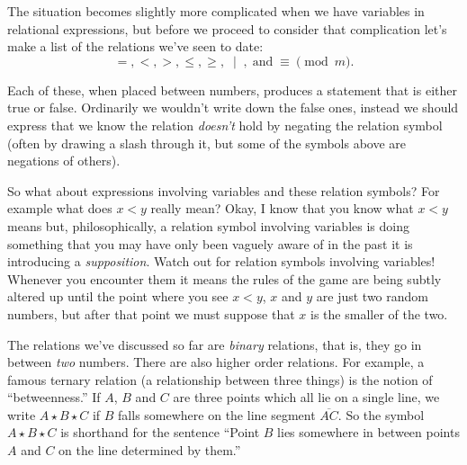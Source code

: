 \documentclass[10pt,]{book}
\theoremstyle{plain}
\theoremstyle{definition}
\theoremstyle{definition}
\numberwithin{equation}{section}
\newcommand{\divides}{\!\mid\!}
\newcommand{\lt}{ < }
\begin{document}
    The situation becomes slightly more complicated when we have
    variables in relational expressions, but before we proceed to
    consider that complication let's make a list of the relations
    we've seen to date:
    \begin{equation*}
      =, \lt , >, \leq, \geq,\; \divides \; , \; \mbox{and}  \; \equiv \pmod{m}.
    \end{equation*}
\par

    Each of these, when placed between numbers, produces a statement that
    is either true or false. Ordinarily we wouldn't write down the
    false ones, instead we should express that we know the relation
    \emph{doesn't} hold by negating the relation symbol (often by
    drawing a slash through it, but some of the symbols above are
    negations of others).
\par

    So what about expressions involving variables and these relation symbols?
    For example what does \(x \lt  y\) really mean? Okay, I know that you know
    what \(x \lt  y\) means but, philosophically, a relation symbol involving variables
    is doing something that you may have only been vaguely aware of in the
    past \textemdash{} it is introducing a \emph{supposition}. Watch out for relation
    symbols involving variables! Whenever you encounter them it means the
    rules of the game are being subtly altered \textemdash{} up until the point where
    you see \(x \lt  y\), \(x\) and \(y\) are just two random numbers, but after that
    point we must suppose that \(x\) is the smaller of the two.
\par

    The relations we've discussed so far are 
    \emph{binary} relations, that
    is, they go in between \emph{two} numbers. There are also higher order
    relations. For example, a famous  ternary
    relation (a relationship between
    three things) is the notion of ``betweenness.'' If \(A\), \(B\) and \(C\) are
    three points which all lie on a single line, we write \(A\star B \star C\)
    if \(B\) falls somewhere on the line segment \(\overline{AC}\). So the
    symbol \(A\star B \star C\) is shorthand for the sentence ``Point \(B\) lies
    somewhere in between points \(A\) and \(C\) on the line determined by them.''
\par
\end{document}
